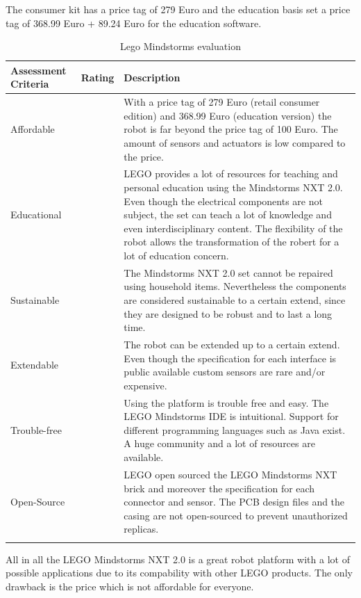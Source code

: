 \documentclass[11pt,a4paper]{article}
\newcounter{starnumber}
\newcommand{\stars}[1]{
  \forloop{starnumber}{1}{\value{starnumber} < 6}{
    \ifthenelse{#1 < \value{starnumber}}{\ding{73}}{\ding{72}}%
  }
}
\begin{document}
The consumer kit has a price tag of 279 Euro and the education basis set a price tag of 368.99 Euro + 89.24 Euro for the education software.


\begin{longtable}{p{}p{}p{}}
\toprule
Assessment Criteria    & Rating & Description \\
\midrule
Affordable  & \stars{2}    & With a price tag of 279 Euro (retail consumer edition) and 368.99 Euro (education version) the robot is far beyond the price tag of 100 Euro. The amount of sensors and actuators is low compared to the price.\\
Educational & \stars{5}     & LEGO provides a lot of resources for teaching and personal education using the Mindstorms NXT 2.0. Even though the electrical components are not subject, the set can teach a lot of knowledge and even interdisciplinary content. The flexibility of the robot allows the transformation of the robert for a lot of education concern. \\
Sustainable  & \stars{3}     & The Mindstorms NXT 2.0 set cannot be repaired using household items. Nevertheless the components are considered sustainable to a certain extend, since they are designed to be robust and to last a long time.\\
Extendable & \stars{3} & The robot can be extended up to a certain extend. Even though the specification for each interface is public available custom sensors are rare and/or expensive. \\
Trouble-free & \stars{5} & Using the platform is trouble free and easy. The LEGO Mindstorms IDE is intuitional. Support for different programming languages such as Java exist. A huge community and a lot of resources are available.\\
Open-Source & \stars{4} & LEGO open sourced the LEGO Mindstorms NXT brick and moreover the specification for each connector and sensor. The PCB design files and the casing are not open-sourced to prevent unauthorized replicas.\\
\bottomrule
\caption{Lego Mindstorms evaluation}
\label{tbl:mindstorms_eval}
\end{longtable}

All in all the LEGO Mindstorms NXT 2.0 is a great robot platform with a lot of possible applications due to its compability with other LEGO products. The only drawback is the price which is not affordable for everyone.
\end{document}
